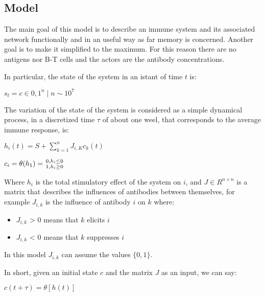 \subsection{Model}

The main goal of this model is to describe an immune system and its associated network functionally and in an useful way as far memory is concerned. Another goal is to make it simplified to the maximum. For this reason there are no antigens nor B-T cells and the actors are the antibody concentrations.

In particular, the state of the system in an istant of time $t$ is: 
\begin{center}
    $s_t= c \in {0,1}^n \mid n \sim  10^7$
\end{center}

The variation of the state of the system is considered as a simple dynamical process, in a discretized time $\tau$ of about one weel, that corresponds to the average immune response, is:
\begin{center}
    $h_i(t) = S + \sum_{k = 1}^{n} J_{i,K} c_k(t)$

    $c_i = \theta(h_1) = {{0, h_i \leq 0} \above 0pt {1, h_i \geq 0}}$
\end{center}

Where $h_i$ is the total stimulatory effect of the system on $i$, and $J \in R^{n \times n}$ is a matrix that describes the influences of antibodies between themselves, for example $J_{i,k}$ is the influence of antibody $i$ on $k$ where:
\begin{itemize}
    \item $J_{i,k}$ > 0 means that $k$ elicits $i$
    \item $J_{i,k}$ < 0 means that $k$ suppresses $i$
\end{itemize}

In this model $J_{i,k}$ can assume the values $\{0,1\}$.

In short, given an initial state $c$ and the matrix $J$ as an input, we can say:
\begin{center}
    $c(t + \tau) = \theta[h(t)]$
\end{center}

\pagebreak